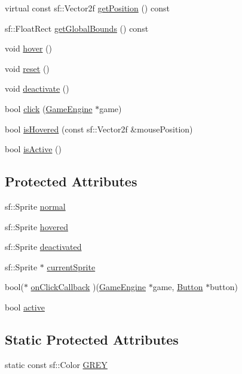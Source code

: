 \begin{DoxyCompactItemize}
virtual const sf\+::\+Vector2f \mbox{\hyperlink{class_button_a01ff4aace35c7d0c4d8b35eda290378f}{get\+Position}} () const
\item 
sf\+::\+Float\+Rect \mbox{\hyperlink{class_button_ab9d2e98e4940309543a9c94509f99437}{get\+Global\+Bounds}} () const
\item 
void \mbox{\hyperlink{class_button_a1a5ca19ed8efe0ea27625217dcab9f2c}{hover}} ()
\item 
void \mbox{\hyperlink{class_button_ae34e8f3c482654e8585360fd639d02e3}{reset}} ()
\item 
void \mbox{\hyperlink{class_button_a57efb09b51a4846a25e7f61abee78cd6}{deactivate}} ()
\item 
bool \mbox{\hyperlink{class_button_ac5e8ae25dcb8a33c6e8711ddbaed71bf}{click}} (\mbox{\hyperlink{class_game_engine}{Game\+Engine}} $\ast$game)
\item 
bool \mbox{\hyperlink{class_button_a4d1a833e7e928d2fe25db3ba28f53e40}{is\+Hovered}} (const sf\+::\+Vector2f \&mouse\+Position)
\item 
bool \mbox{\hyperlink{class_button_acf2ea3a5fea9e6cb24b291fabab033ff}{is\+Active}} ()
\end{DoxyCompactItemize}
\subsection*{Protected Attributes}
\begin{DoxyCompactItemize}
\item 
sf\+::\+Sprite \mbox{\hyperlink{class_button_a5a2a5e1c6b378762f5b2fe39e9053d9e}{normal}}
\item 
sf\+::\+Sprite \mbox{\hyperlink{class_button_a181477cb3462763b510a30a4f27cd756}{hovered}}
\item 
sf\+::\+Sprite \mbox{\hyperlink{class_button_a85f7fc9ea9ff8aae240469b0bddb662a}{deactivated}}
\item 
sf\+::\+Sprite $\ast$ \mbox{\hyperlink{class_button_ae43bb88d6b390a0ab6607278102952c4}{current\+Sprite}}
\item 
bool($\ast$ \mbox{\hyperlink{class_button_a24293b3761997dd52758ee21c0058661}{on\+Click\+Callback}} )(\mbox{\hyperlink{class_game_engine}{Game\+Engine}} $\ast$game, \mbox{\hyperlink{class_button}{Button}} $\ast$button)
\item 
bool \mbox{\hyperlink{class_button_a03070c78335786c482088bf00c894325}{active}}
\end{DoxyCompactItemize}
\subsection*{Static Protected Attributes}
\begin{DoxyCompactItemize}
\item 
static const sf\+::\+Color \mbox{\hyperlink{class_button_afc0927052e6f57f0cfc7521953421617}{G\+R\+EY}}
\end{DoxyCompactItemize}


